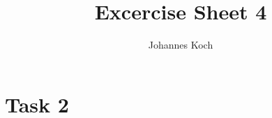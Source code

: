 \documentclass[11pt]{article} %
\title{Excercise Sheet 4}
\author{Johannes Koch}
\begin{document}
\maketitle

\section{Task 2}


\end{document}

